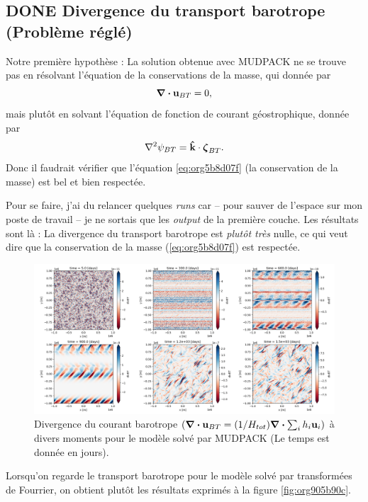 \documentclass[10pt]{report}
\numberwithin{equation}{section}
\newcommand{\kvf}{\vb{\hat{k}}}
\newcommand{\uu}{\vb{u}}
\begin{document}
\subsection{{\bfseries\sffamily DONE} Divergence du transport barotrope (Problème réglé)}
\label{sec:orgd37b18e}
Notre première hypothèse : La solution obtenue avec MUDPACK ne se trouve pas en résolvant l'équation de la conservations de la masse, qui donnée par
\begin{equation}
\label{eq:org5b8d07f}
   \div{\uu_{BT}} = 0,
\end{equation}
mais plutôt en solvant l'équation de fonction de courant géostrophique, donnée par
\begin{equation}
   \laplacian{\psi_{BT}} = \kvf \cdot \boldsymbol{\zeta}_{BT}.
\end{equation}
Donc il faudrait vérifier que l'équation \ref{eq:org5b8d07f} (la conservation de la masse) est bel et bien respectée.\bigskip

Pour se faire, j'ai du relancer quelques \emph{runs} car -- pour sauver de l'espace sur mon poste de travail -- je ne sortais que les \emph{output} de la première couche.
Les résultats sont là :
La divergence du transport barotrope est \emph{plutôt très} nulle, ce qui veut dire que la conservation de la masse (\ref{eq:org5b8d07f}) est respectée.

\begin{figure}[!htpb]
\centering
\includegraphics[width=.9\linewidth]{figures/debuggage/2023_06_21divBT1_MUD.png}
\caption{\label{fig:orged3e49c}Divergence du courant barotrope \(\qty(\div{\uu_{BT}} = \qty(1/H_{tot}) \div{\sum_i h_i \uu_i})\) à divers moments pour le modèle solvé par MUDPACK (Le temps est donnée en jours).}
\end{figure}

Lorsqu'on regarde le transport barotrope pour le modèle solvé par transformées de Fourrier, on obtient plutôt les résultats exprimés à la figure \ref{fig:org905b90c}. 
\end{document}
